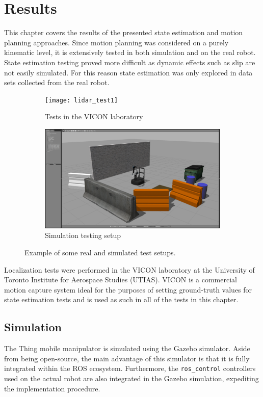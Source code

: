 \documentclass[times, utf8, diplomski, english]{fer}
\begin{document}
\chapter{Results}
This chapter covers the results of the presented state estimation and motion planning approaches.
Since motion planning was considered on a purely kinematic level, it is extensively tested in both simulation and on the real robot.
State estimation testing proved more difficult as dynamic effects such as slip are not easily simulated.
For this reason state estimation was only explored in data sets collected from the real robot.
\begin{figure}[h]
    \centering
    \begin{subfigure}[t]{0.45\textwidth}
        \texttt{[image: lidar\_test1]}
        \caption{Tests in the VICON laboratory}
        \label{figure:VICONtest}
    \end{subfigure}
    \begin{subfigure}[t]{0.45\textwidth}
        \includegraphics[trim={25cm 2.5cm 10cm 8cm},clip,width=\textwidth]{gazebo_screenshot1}
        \caption{Simulation testing setup}
        \label{figure:simulationtest}
    \end{subfigure}
    \caption{Example of some real and simulated test setups.}\label{fig:resultsphotos}
\end{figure}
Localization tests were performed in the VICON laboratory at the University of Toronto Institute for Aerospace Studies (UTIAS).
VICON is a commercial motion capture system ideal for the purposes of setting ground-truth values for state estimation tests and is used as such in all of the tests in this chapter. 
\section{Simulation}
The Thing mobile manipulator is simulated using the Gazebo simulator.
Aside from being open-source, the main advantage of this simulator is that it is fully integrated within the ROS ecosystem.
Furthermore, the \verb|ros_control| controllers used on the actual robot are also integrated in the Gazebo simulation, expediting the implementation procedure.
\end{document}
